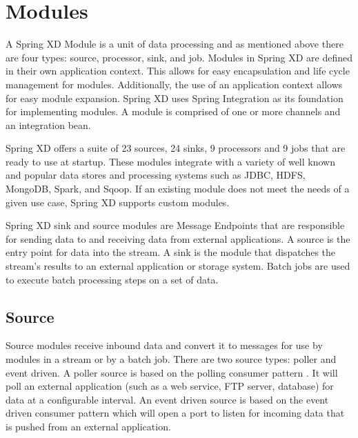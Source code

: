 \section{Modules}
\label{sec:Modules}
A Spring XD Module \cite{modules} is a unit of data processing and as mentioned above 
there are four types: source, processor, sink, and job. Modules in Spring XD are defined 
in their own application context. This allows for easy encapsulation and life cycle 
management for modules. Additionally, the use of an application context allows for easy 
module expansion.  Spring XD uses Spring Integration \cite{spring-integration-reference} 
as its foundation for implementing modules. A module is comprised of one or more channels 
and an integration bean.

\par

Spring XD offers a suite of 23 sources, 24 sinks, 9 processors and 9 jobs that are ready 
to use at startup.  These modules integrate with a variety of well
known and popular data stores and processing systems such as JDBC, HDFS, MongoDB, Spark,
and Sqoop.  If an existing module does not meet the needs of a given use case, Spring XD
supports custom modules.

Spring XD sink and source modules are Message Endpoints 
\cite{enterprise-integration-pattern-message-endpoint} 
that are responsible for sending data to and receiving data from external applications.
A source is the entry point for data into the stream. A sink is the module that dispatches
the stream's results to an external application or storage system. Batch jobs are used to
execute batch processing steps on a set of data.

\par

\subsection{Source}
Source modules receive inbound data and convert it to messages for
use by modules in a stream or by a batch job.
There are two source types: poller and event driven.  A poller source is based on the polling
consumer pattern \cite{enterprise-integration-pattern-pollingconsumer}. It
will poll an external application (such as a web service, FTP server, database) for data at a
configurable interval. An event driven source is based on the event driven
consumer pattern \cite{enterprise-integration-pattern-eventdrivenconsumer} which will
open a port to listen for incoming data that is pushed from an external application.

